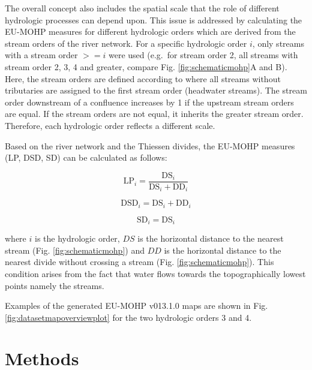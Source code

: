 \documentclass[fleqn,10pt]{wlscirep}
\begin{document}
The overall concept also includes the spatial scale that the role of different hydrologic processes can depend upon. This issue is addressed by calculating the EU-MOHP measures for different hydrologic orders which are derived from the stream orders of the river network. For a specific hydrologic order \(i\), only streams with a stream order \(>= i\) were used (e.g.~for stream order 2, all streams with stream order 2, 3, 4 and greater, compare Fig. \ref{fig:schematicmohp}A and B). Here, the stream orders are defined according to \cite{strahler_quantitative_1957} where all streams without tributaries are assigned to the first stream order (headwater streams). The stream order downstream of a confluence increases by 1 if the upstream stream orders are equal. If the stream orders are not equal, it inherits the greater stream order. Therefore, each hydrologic order reflects a different scale.

Based on the river network and the Thiessen divides, the EU-MOHP measures (LP, DSD, SD) can be calculated as follows:

\begin{equation}
\text{LP}_i = \frac{\text{DS}_i}{\text{DS}_i + \text{DD}_i} \label{eq:eqlp}
\end{equation}

\begin{equation}
\text{DSD}_i = \text{DS}_i + \text{DD}_i \label{eq:eqdsd}
\end{equation}

\begin{equation}
\text{SD}_i = \text{DS}_i \label{eq:eqsd}
\end{equation}

\noindent
where \(i\) is the hydrologic order, \(DS\) is the horizontal distance to the nearest stream (Fig. \ref{fig:schematicmohp}) and \(DD\) is the horizontal distance to the nearest divide without crossing a stream (Fig. \ref{fig:schematicmohp}). This condition arises from the fact that water flows towards the topographically lowest points namely the streams.

Examples of the generated EU-MOHP v013.1.0 maps are shown in Fig. \ref{fig:datasetmapoverviewplot} for the two hydrologic orders 3 and 4.

\hypertarget{methods}{%
\section*{Methods}\label{methods}}
\end{document}
